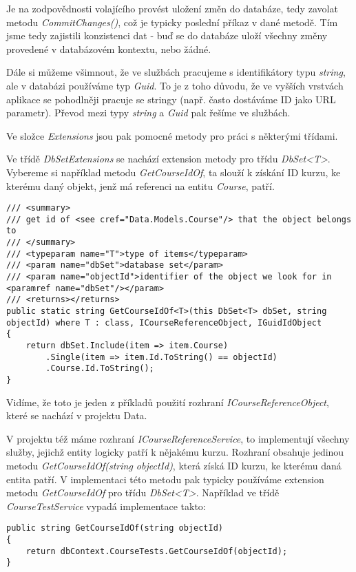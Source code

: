 Je na zodpovědnosti volajícího provést uložení změn do databáze, tedy zavolat metodu \textit{CommitChanges()}, což je typicky poslední příkaz v dané metodě.
Tím jsme tedy zajistili konzistenci dat - buď se do databáze uloží všechny změny provedené v databázovém kontextu, nebo žádné.

Dále si můžeme všimnout, že ve službách pracujeme s identifikátory typu \textit{string}, ale v databázi používáme typ \textit{Guid}. To je z toho důvodu, že ve vyšších vrstvách aplikace se pohodlněji pracuje se stringy (např. často dostáváme ID jako URL parametr). Převod mezi typy \textit{string} a \textit{Guid} pak řešíme ve službách.

Ve složce \textit{Extensions} jsou pak pomocné metody pro práci s některými třídami.

Ve třídě \textit{DbSetExtensions} se nachází extension metody pro třídu \textit{DbSet<T>}. Vybereme si například metodu \textit{GetCourseIdOf}, ta slouží k získání ID kurzu, ke kterému daný objekt, jenž má referenci na entitu \textit{Course}, patří.
\begin{lstlisting}
/// <summary>
/// get id of <see cref="Data.Models.Course"/> that the object belongs to
/// </summary>
/// <typeparam name="T">type of items</typeparam>
/// <param name="dbSet">database set</param>
/// <param name="objectId">identifier of the object we look for in <paramref name="dbSet"/></param>
/// <returns></returns>
public static string GetCourseIdOf<T>(this DbSet<T> dbSet, string objectId) where T : class, ICourseReferenceObject, IGuidIdObject
{
	return dbSet.Include(item => item.Course)
		.Single(item => item.Id.ToString() == objectId)
		.Course.Id.ToString();
}
\end{lstlisting}

Vidíme, že toto je jeden z příkladů použití rozhraní \textit{ICourseReferenceObject}, které se nachází v projektu Data.

V projektu též máme rozhraní \textit{ICourseReferenceService}, to implementují všechny služby, jejichž entity logicky patří k nějakému kurzu. Rozhraní obsahuje jedinou metodu \textit{GetCourseIdOf(string objectId)}, která získá ID kurzu, ke kterému daná entita patří. V implementaci této metodu pak typicky používáme extension metodu \textit{GetCourseIdOf} pro třídu \textit{DbSet<T>}. Například ve třídě \textit{CourseTestService} vypadá implementace takto:

\begin{lstlisting}
public string GetCourseIdOf(string objectId)
{
	return dbContext.CourseTests.GetCourseIdOf(objectId);
}
\end{lstlisting}

